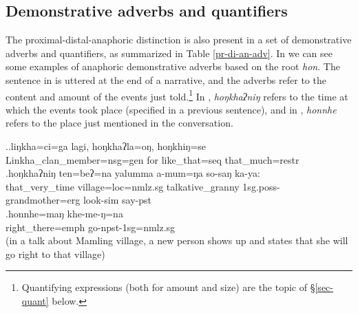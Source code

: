 \subsection{Demonstrative adverbs and quantifiers}\label{dem-set1rel}

The proximal-distal-anaphoric distinction is also present in a set of demonstrative adverbs and quantifiers, as summarized in Table \ref{pr-di-an-adv}. In \Next we can see some examples of anaphoric demonstrative adverbs based on the root \emph{hon}. The sentence in \Next[a] is uttered at the end of a narrative, and the adverbs refer to the content and amount of the events just told.\footnote{Quantifying expressions (both for amount and size) are the topic of §\ref{sec-quant} below.}  In \Next[b], \emph{hoŋkhaʔniŋ} refers to the time at which the events took place (specified in a previous sentence), and in \Next[c], \emph{honnhe} refers to the place just mentioned in the conversation.

\ex.\ag.liŋkha=ci=ga         lagi, hoŋkhaʔla=oŋ,    hoŋkhiŋ=se\\
Linkha\_clan\_member{\sc =nsg=gen} for like\_that{\sc =seq} that\_much{\sc =restr}\\
 
\bg.hoŋkhaʔniŋ ten=beʔ=na               yalumma          a-mum=ŋa   so-saŋ    ka-ya:\\
that\_very\_time village{\sc =loc=nmlz.sg} talkative\_granny  {\sc 1sg.poss-}grandmother{\sc =erg} look{\sc -sim} say{\sc [3sg]-pst}\\
  
\bg.honnhe=maŋ khe-me-ŋ=na\\
right\_there{\sc =emph} go{\sc -npst-1sg=nmlz.sg}\\
 (in a talk about Mamling village, a new person shows up and states that she will go right to that village)	
	
